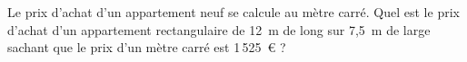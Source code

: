 Le prix d'achat d'un appartement neuf se calcule au mètre carré. Quel
 est le prix d'achat d'un appartement rectangulaire de 12~m de long
 sur 7,5~m de large sachant que le prix d'un mètre carré est
 1\,525~\textgreek{\euro} ?